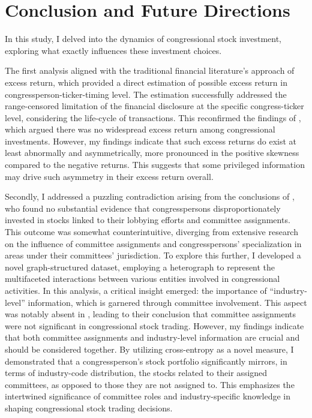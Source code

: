 \documentclass[15pt,letterpaper]{article}
\begin{document}
\section{Conclusion and Future Directions}
In this study, 
I delved into the dynamics of congressional stock investment, exploring what exactly influences these investment choices. 

The first analysis aligned with the traditional financial literature's approach of excess return, which provided a direct estimation of possible excess return in congressperson-ticker-timing level. 
The estimation successfully addressed the range-censored limitation of the financial disclosure at the specific congress-ticker level, considering the life-cycle of transactions.
This reconfirmed the findings of \cite{eg13}, which argued there was no widespread excess return among congressional investments. However, my findings indicate that such excess returns do exist at least abnormally and asymmetrically, more pronounced in the positive skewness compared to the negative returns. This suggests that some privileged information may drive such asymmetry in their excess return overall.

Secondly, I addressed a puzzling contradiction arising from the conclusions of \cite{eg14}, who found no substantial evidence that congresspersons disproportionately invested in stocks linked to their lobbying efforts and committee assignments. This outcome was somewhat counterintuitive, diverging from extensive research on the influence of committee assignments and congresspersons' specialization in areas under their committees' jurisdiction. To explore this further, I developed a novel graph-structured dataset, employing a heterograph to represent the multifaceted interactions between various entities involved in congressional activities.
In this analysis, a critical insight emerged: the importance of ``industry-level'' information, which is garnered through committee involvement. This aspect was notably absent in \cite{eg14}, leading to their conclusion that committee assignments were not significant in congressional stock trading. However, my findings indicate that both committee assignments and industry-level information are crucial and should be considered together. By utilizing cross-entropy as a novel measure, I demonstrated that a congressperson's stock portfolio significantly mirrors, in terms of industry-code distribution, the stocks related to their assigned committees, as opposed to those they are not assigned to. This emphasizes the intertwined significance of committee roles and industry-specific knowledge in shaping congressional stock trading decisions.
\end{document}
